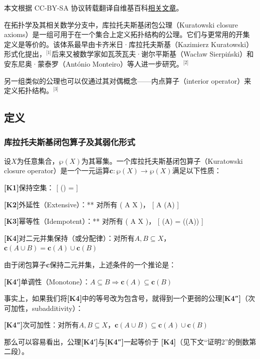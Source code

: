 
本文根据 CC-BY-SA 协议转载翻译自维基百科\href{https://en.wikipedia.org/wiki/Kuratowski_closure_axioms}{相关文章}。

在拓扑学及其相关数学分支中，库拉托夫斯基闭包公理（Kuratowski closure axioms）是一组可用于在一个集合上定义拓扑结构的公理。它们与更常用的开集定义是等价的。该体系最早由卡齐米日·库拉托夫斯基（Kazimierz Kuratowski）形式化提出，\(^\text{[1]}\)后来又被数学家如瓦茨瓦夫·谢尔平斯基（Wacław Sierpiński）和安东尼奥·蒙泰罗（António Monteiro）等人进一步研究。\(^\text{[2]}\)

另一组类似的公理也可以仅通过其对偶概念——内点算子（interior operator）来定义拓扑结构。\(^\text{[3]}\)
\subsection{定义}
\subsubsection{库拉托夫斯基闭包算子及其弱化形式}
设$X$为任意集合，$\wp(X)$为其幂集。一个库拉托夫斯基闭包算子（Kuratowski closure operator）是一个一元运算$\mathbf{c} : \wp(X) \to \wp(X)$满足以下性质：

\textbf{[K1]}保持空集：
  [
  (\varnothing) = \varnothing
  ]

\textbf{[K2]}外延性（Extensive）：** 对所有 ( A \subseteq X )，
  [
  A \subseteq {}(A)
  ]

\textbf{[K3]}幂等性（Idempotent）：** 对所有 ( A \subseteq X )，
  [
  (A) = ((A))
  ]

\textbf{[K4]}对二元并集保持（或分配律）：对所有$A, B \subseteq X$，
$\mathbf{c}(A \cup B) = \mathbf{c}(A) \cup \mathbf{c}(B)$

由于闭包算子$\mathbf{c}$保持二元并集，上述条件的一个推论是：

\textbf{[K4′]}单调性（Monotone）：$A \subseteq B \Rightarrow \mathbf{c}(A) \subseteq \mathbf{c}(B)$

事实上，如果我们将\textbf{[K4]}中的等号改为包含号，就得到一个更弱的公理\textbf{[K4″]}（次可加性，subadditivity）：

\textbf{[K4″]}次可加性：对所有$A, B \subseteq X $，$\mathbf{c}(A \cup B) \subseteq \mathbf{c}(A) \cup \mathbf{c}(B)$

那么可以容易看出，公理\textbf{[K4′]}与\textbf{[K4″]}一起等价于 \textbf{[K4]}（见下文“证明2”的倒数第二段）。

